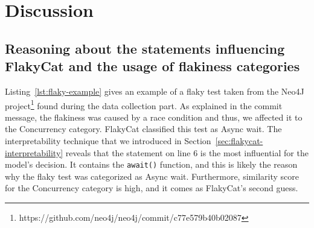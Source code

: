 \section{Discussion}
\label{sec:flakycat-discussion}






\subsection{Reasoning about the statements influencing FlakyCat and the usage of flakiness categories}
\label{sec:discussion:reasoning}

Listing~\ref{lst:flaky-example} gives an example of a flaky test taken from the Neo4J project\footnote{https://github.com/neo4j/neo4j/commit/c77e579b40b02087} found during the data collection part.
As explained in the commit message, the flakiness was caused by a race condition and thus, we affected it to the Concurrency category. FlakyCat classified this test as Async wait. The interpretability technique that we introduced in Section~\ref{sec:flakycat-interpretability} reveals that the statement on line 6 is the most influential for the model's decision. It contains the \texttt{await()} function, and this is likely the reason why the flaky test was categorized as Async wait. Furthermore, similarity score for the Concurrency category is high, and it comes as FlakyCat's second guess. 

